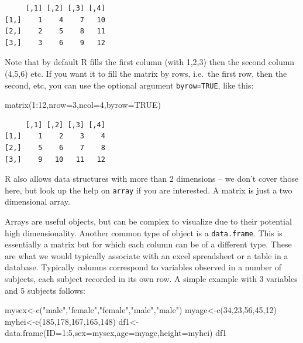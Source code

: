 \documentclass[
  letterpaper,
  DIV=11,
  numbers=noendperiod]{scrartcl}
\newenvironment{Shaded}{\begin{snugshade}}{\end{snugshade}}
\newcommand{\AttributeTok}[1]{\textcolor[rgb]{0.40,0.45,0.13}{#1}}
\newcommand{\ConstantTok}[1]{\textcolor[rgb]{0.56,0.35,0.01}{#1}}
\newcommand{\DecValTok}[1]{\textcolor[rgb]{0.68,0.00,0.00}{#1}}
\newcommand{\FunctionTok}[1]{\textcolor[rgb]{0.28,0.35,0.67}{#1}}
\newcommand{\NormalTok}[1]{\textcolor[rgb]{0.00,0.23,0.31}{#1}}
\newcommand{\OtherTok}[1]{\textcolor[rgb]{0.00,0.23,0.31}{#1}}
\newcommand{\SpecialCharTok}[1]{\textcolor[rgb]{0.37,0.37,0.37}{#1}}
\newcommand{\StringTok}[1]{\textcolor[rgb]{0.13,0.47,0.30}{#1}}
\begin{document}
\begin{verbatim}
     [,1] [,2] [,3] [,4]
[1,]    1    4    7   10
[2,]    2    5    8   11
[3,]    3    6    9   12
\end{verbatim}

Note that by default R fills the first column (with 1,2,3) then the
second column (4,5,6) etc. If you want it to fill the matrix by rows,
i.e.~the first row, then the second, etc, you can use the optional
argument \texttt{byrow=TRUE}, like this:

\begin{Shaded}
\begin{Highlighting}[]
\FunctionTok{matrix}\NormalTok{(}\DecValTok{1}\SpecialCharTok{:}\DecValTok{12}\NormalTok{,}\AttributeTok{nrow=}\DecValTok{3}\NormalTok{,}\AttributeTok{ncol=}\DecValTok{4}\NormalTok{,}\AttributeTok{byrow=}\ConstantTok{TRUE}\NormalTok{)}
\end{Highlighting}
\end{Shaded}

\begin{verbatim}
     [,1] [,2] [,3] [,4]
[1,]    1    2    3    4
[2,]    5    6    7    8
[3,]    9   10   11   12
\end{verbatim}

R also allows data structures with more than 2 dimensions -- we don't
cover those here, but look up the help on \texttt{array} if you are
interested. A matrix is just a two dimensional array.

Arrays are useful objects, but can be complex to visualize due to their
potential high dimensionality. Another common type of object is a
\texttt{data.frame}. This is essentially a matrix but for which each
column can be of a different type. These are what we would typically
associate with an excel spreadsheet or a table in a database. Typically
columns correspond to variables observed in a number of subjects, each
subject recorded in its own row. A simple example with 3 variables and 5
subjects follows:

\begin{Shaded}
\begin{Highlighting}[]
\NormalTok{mysex}\OtherTok{\textless{}{-}}\FunctionTok{c}\NormalTok{(}\StringTok{"male"}\NormalTok{,}\StringTok{"female"}\NormalTok{,}\StringTok{"female"}\NormalTok{,}\StringTok{"male"}\NormalTok{,}\StringTok{"male"}\NormalTok{)}
\NormalTok{myage}\OtherTok{\textless{}{-}}\FunctionTok{c}\NormalTok{(}\DecValTok{34}\NormalTok{,}\DecValTok{23}\NormalTok{,}\DecValTok{56}\NormalTok{,}\DecValTok{45}\NormalTok{,}\DecValTok{12}\NormalTok{)}
\NormalTok{myhei}\OtherTok{\textless{}{-}}\FunctionTok{c}\NormalTok{(}\DecValTok{185}\NormalTok{,}\DecValTok{178}\NormalTok{,}\DecValTok{167}\NormalTok{,}\DecValTok{165}\NormalTok{,}\DecValTok{148}\NormalTok{)}
\NormalTok{df1}\OtherTok{\textless{}{-}}\FunctionTok{data.frame}\NormalTok{(}\AttributeTok{ID=}\DecValTok{1}\SpecialCharTok{:}\DecValTok{5}\NormalTok{,}\AttributeTok{sex=}\NormalTok{mysex,}\AttributeTok{age=}\NormalTok{myage,}\AttributeTok{height=}\NormalTok{myhei)}
\NormalTok{df1}
\end{Highlighting}
\end{Shaded}
\end{document}
